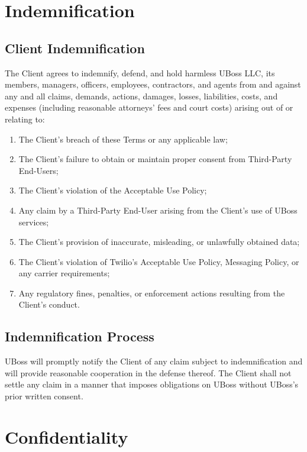 \documentclass[11pt,letterpaper,parskip=half]{scrartcl}
\begin{document}
\section{Indemnification}

\subsection{Client Indemnification}

The Client agrees to indemnify, defend, and hold harmless UBoss LLC, its members, managers, officers, employees, contractors, and agents from and against any and all claims, demands, actions, damages, losses, liabilities, costs, and expenses (including reasonable attorneys' fees and court costs) arising out of or relating to:

\begin{enumerate}[nosep, leftmargin=1.5em]
    \item The Client's breach of these Terms or any applicable law;
    \item The Client's failure to obtain or maintain proper consent from Third-Party End-Users;
    \item The Client's violation of the Acceptable Use Policy;
    \item Any claim by a Third-Party End-User arising from the Client's use of UBoss services;
    \item The Client's provision of inaccurate, misleading, or unlawfully obtained data;
    \item The Client's violation of Twilio's Acceptable Use Policy, Messaging Policy, or any carrier requirements;
    \item Any regulatory fines, penalties, or enforcement actions resulting from the Client's conduct.
\end{enumerate}

\subsection{Indemnification Process}

UBoss will promptly notify the Client of any claim subject to indemnification and will provide reasonable cooperation in the defense thereof. The Client shall not settle any claim in a manner that imposes obligations on UBoss without UBoss's prior written consent.

\section{Confidentiality}
\end{document}
